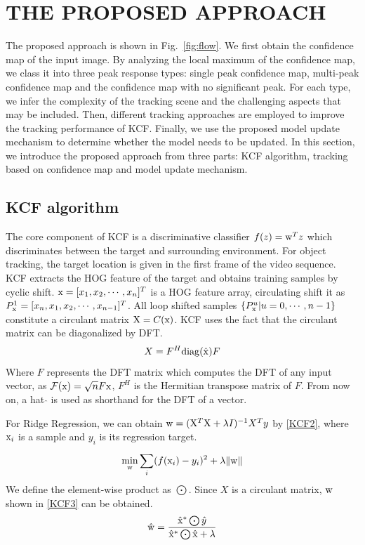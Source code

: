 \documentclass[conference]{IEEEtran}
\begin{document}
\section{THE PROPOSED APPROACH}
The proposed approach is shown in Fig.~\ref{fig:flow}.
We first obtain the confidence map of the input image.
By analyzing the local maximum of the confidence map, we class it into three peak response types: single peak confidence map, multi-peak confidence map and the confidence map with no significant peak.
For each type, we infer the complexity of the tracking scene and the challenging aspects that may be included.
Then, different tracking approaches are employed to improve the tracking performance of KCF.
Finally, we use the proposed model update mechanism to determine whether the model needs to be updated.
In this section, we introduce the proposed approach from three parts: KCF algorithm, tracking based on confidence map and model update mechanism. 

\subsection{KCF algorithm}
The core component of KCF is a discriminative classifier $f(z)={\rm w}^{T}z$ which discriminates between the target and surrounding environment.
For object tracking, the target location is given in the first frame of the video sequence.
KCF extracts the HOG feature \cite{HOG} of the target and obtains training samples by cyclic shift.
${\rm x}=[x_1,x_2,\cdots,x_n]^T$ is a HOG feature array, circulating shift it as $P_{\rm x}^1=[x_n,x_1,x_2,\cdots,x_{n-1}]^T$.
All loop shifted samples $\{P_{\rm x}^u|u=0,\cdots,n-1\}$ constitute a circulant matrix ${\rm X}=C({\rm x})$. 
KCF uses the fact that the circulant matrix can be diagonalized by DFT.
\begin{equation}
X=F^{H}{\rm diag}(\hat{{\rm x}})F
\label{KCF1}
\end{equation} 
Where $F$ represents the DFT matrix which computes the DFT of any input vector, as $\mathcal{F}({\rm x})=\sqrt{n}F{\rm x}$, $F^H$ is the Hermitian transpose matrix of $F$. From now on, a hat $\hat{}$ is used as shorthand for the DFT of a vector. 

For Ridge Regression, we can obtain ${\rm w}=({\rm X}^{T}{\rm X} +\lambda I)^{-1}X^{T}y$ by \eqref{KCF2}, where ${\rm x}_i$ is a sample and $y_i$ is its regression target.
\begin{equation}
\mathop{\min}_{{\rm w}}\sum_{i}^{}(f({\rm x}_i)-y_i)^2+\lambda\|{\rm w}\|
\label{KCF2}
\end{equation}
We define the element-wise product as $\bigodot$.
Since $X$ is a circulant matrix, ${\rm w}$ shown in \eqref{KCF3} can be obtained.
\begin{equation}
\hat{{\rm w}}=\frac{\hat{{\rm x}}^*\bigodot \hat{y}}{\hat{{\rm x}}^*\bigodot \hat{{\rm x}}+\lambda}
\label{KCF3}
\end{equation}
\end{document}
